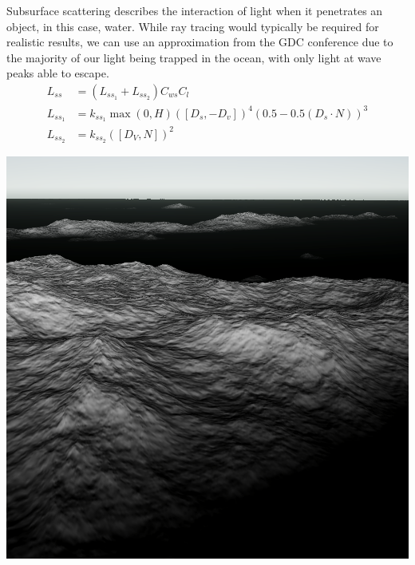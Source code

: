 Subsurface scattering describes the interaction of light when it penetrates an object, in this case, water. While ray tracing would typically be required for realistic results, we can use an approximation from the GDC conference \cite{mark2021} due to the majority of our light being trapped in the ocean, with only light at wave peaks able to escape. 
\begin{equation}
    \begin{split}
        L_{ss} &= (L_{ss_1} + L_{ss_2}) C_{ws} C_l\\
        L_{ss_1} &= k_{ss_1} \max(0, H) ([D_s, -D_v])^{4}(0.5-0.5(D_s \cdot N))^{3}\\
        L_{ss_2} &= k_{ss_2} ([D_V, N])^{2}
    \end{split}
\end{equation}
\begin{minipage}{0.32\textwidth}
    \includegraphics[width=1\textwidth]{"images/ss1_light.png"}
    \label{fig:lss1_light}
\end{minipage}
\hfill
